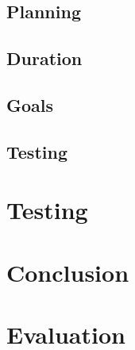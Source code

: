 \documentclass[10pt,a4paper,oneside]{report}
\begin{document}
\section{Planning}
\section{Duration}
\section{Goals}
\section{Testing}

\chapter{Testing}

\chapter{Conclusion}

\chapter{Evaluation}
\end{document}
